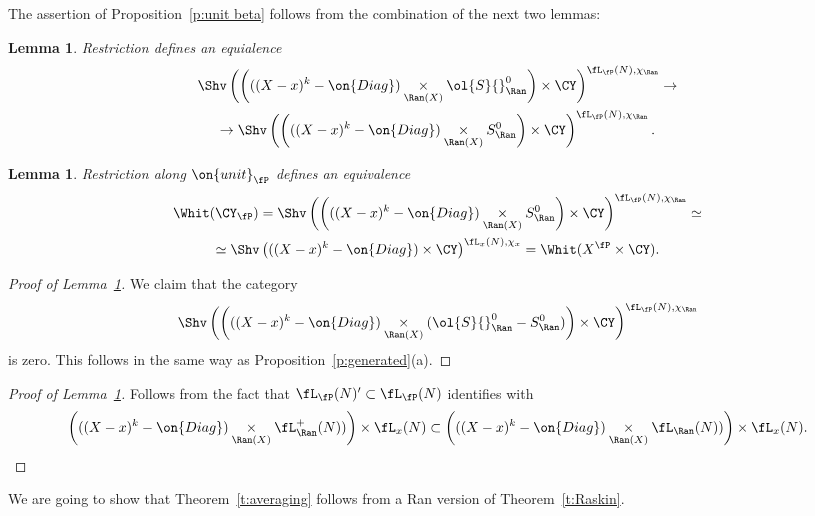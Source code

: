 \documentclass[9pt]{amsart}
\newtheorem{lem}[subsubsection]{Lemma}
\theoremstyle{definition}
\theoremstyle{remark}
\newcommand{\thmref}[1]{Theorem~\ref{#1}}
\newcommand{\lemref}[1]{Lemma~\ref{#1}}
\newcommand{\propref}[1]{Proposition~\ref{#1}}
\numberwithin{equation}{section}
\begin{document}
The assertion of \propref{p:unit beta} follows from the combination of the next two lemmas:

\begin{lem} \label{l:restr to open}
Restriction defines an equialence
\begin{multline*}
\Shv\left(\left(((X-x)^k-\on{Diag})\underset{\Ran(X)}\times \ol{S}{}^0_\Ran\right)\times \CY\right)^{\fL_\fP(N),\chi_\Ran}\to \\
\to \Shv\left(\left(((X-x)^k-\on{Diag})\underset{\Ran(X)}\times S^0_\Ran\right)\times \CY\right)^{\fL_\fP(N),\chi_\Ran}.
\end{multline*}
\end{lem}

\begin{lem}  \label{l:open to unit}
Restriction along $\on{unit}_\fP$ defines an equivalence
\begin{multline*}
\Whit(\CY_\fP)=
\Shv\left(\left(((X-x)^k-\on{Diag})\underset{\Ran(X)}\times S^0_\Ran\right)\times \CY\right)^{\fL_\fP(N),\chi_\Ran}\simeq \\
\simeq \Shv\left(((X-x)^k-\on{Diag})\times \CY\right)^{\fL_x(N),\chi_x}= \Whit(X^\fP\times \CY).
\end{multline*}
\end{lem}

\begin{proof}[Proof of \lemref{l:restr to open}]

We claim that the category
$$\Shv\left(\left(((X-x)^k-\on{Diag})\underset{\Ran(X)}\times (\ol{S}{}^0_\Ran-S^0_\Ran)\right)\times \CY\right)^{\fL_\fP(N),\chi_\Ran}$$
is zero. This follows in the same way as \propref{p:generated}(a).

\end{proof}

\begin{proof}[Proof of \lemref{l:open to unit}]

Follows from the fact that $\fL_\fP(N)'\subset \fL_\fP(N)$ identifies with
$$\left(((X-x)^k-\on{Diag})\underset{\Ran(X)}\times \fL^+_\Ran(N))\right)\times \fL_x(N)\subset
\left(((X-x)^k-\on{Diag})\underset{\Ran(X)}\times \fL_\Ran(N))\right)\times \fL_x(N).$$

\end{proof}

\ssec{Proof of \thmref{t:averaging}}  \label{ss:proof of average}

We are going to show that \thmref{t:averaging} follows from a Ran version of \thmref{t:Raskin}. 
\end{document}
